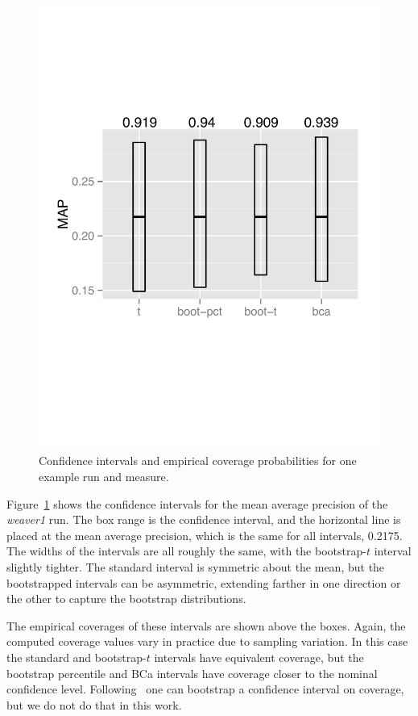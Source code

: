 \documentclass{sig-alt-release-2013}
\begin{document}
\begin{figure}[t!]
\includegraphics[width=\linewidth]{weaver1}
\caption{\label{run}Confidence intervals and empirical coverage probabilities for one example run and measure.}
\end{figure}

Figure~\ref{run} shows the confidence intervals for the mean average precision of the {\em weaver1} run.  The box range is the confidence interval, and the horizontal line is placed at the mean average precision, which is the same for all intervals, 0.2175.  The widths of the intervals are all roughly the same, with the bootstrap-$t$ interval slightly tighter.  The standard interval is symmetric about the mean, but the bootstrapped intervals can be asymmetric, extending farther in one direction or the other to capture the bootstrap distributions.

The empirical coverages of these intervals are shown above the boxes.  Again, the computed coverage values vary in practice due to sampling variation.  In this case the standard and bootstrap-$t$ intervals have equivalent coverage, but the bootstrap percentile and BCa intervals have coverage closer to the nominal confidence level. Following~\cite{Schall12} one can bootstrap a confidence interval on coverage, but we do not do that in this work.
\end{document}
